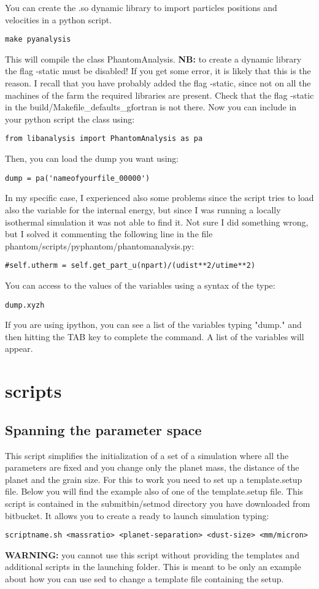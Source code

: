 \documentclass[10pt,a4paper,twoside]{article} %
\begin{document}
You can create the .so dynamic library to import particles positions and velocities in a python script.
\begin{verbatim}
make pyanalysis
\end{verbatim}
This will compile the class PhantomAnalysis. \textbf{NB:} to create a dynamic library the flag -static must be disabled! If you get some error, it is likely that this is the reason. I recall that you have probably added the flag -static, since not on all the machines of the farm the required libraries are present. Check that the flag -static in the build/Makefile\_defaults\_gfortran is not there.
Now you can include in your python script the class using:
\begin{verbatim}
from libanalysis import PhantomAnalysis as pa
\end{verbatim}
Then, you can load the dump you want using:
\begin{verbatim}
dump = pa('nameofyourfile_00000')
\end{verbatim}
In my specific case, I experienced also some problems since the script tries to load also the variable for the internal energy, but since I was running a locally isothermal simulation it was not able to find it. Not sure I did something wrong, but I solved it commenting the following line in the file phantom/scripts/pyphantom/phantomanalysis.py:
\begin{verbatim}
#self.utherm = self.get_part_u(npart)/(udist**2/utime**2)
\end{verbatim}
You can access to the values of the variables using a syntax of the type:
\begin{verbatim}
dump.xyzh
\end{verbatim}
If you are using ipython, you can see a list of the variables typing "dump." and then hitting the TAB key to complete the command. A list of the variables will appear.

\section{scripts}

\subsection{Spanning the parameter space}\label{pspacespan}

This script simplifies the initialization of a set of a simulation where all the parameters are fixed and you change only the planet mass, the distance of the planet and the grain size. For this to work you need to set up a template.setup file. Below you will find the example also of one of the template.setup file. This script is contained in the submitbin/setmod directory you have downloaded from bitbucket.
It allows you to create a ready to launch simulation typing:
\begin{verbatim}
scriptname.sh <massratio> <planet-separation> <dust-size> <mm/micron>
\end{verbatim}
\textbf{WARNING:} you cannot use this script without providing the templates and additional scripts in the launching folder. This is meant to be only an example about how you can use sed to change a template file containing the setup.
\end{document}
